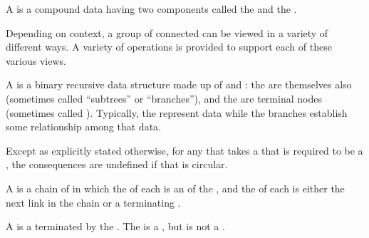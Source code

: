 
A  is a compound data  
having two components called the  and the .


Depending on context, a group of connected  can be viewed
in a variety of different ways.  A variety of operations is provided to
support each of these various views.


A  is a binary recursive data structure made up of
 and :
the  are themselves also 
(sometimes called ``subtrees'' or ``branches''), and the 
are terminal nodes (sometimes called ). 
Typically, the  represent data while the branches 
establish some relationship among that data.



Except as explicitly stated otherwise,
for any   that takes a 
that is required to be a ,
the consequences are undefined
if that  is circular.

\endsubsubsection%

\endsubsection%


A  is a chain of  in which the  of each
 is an  of the , 
and the  of each  is either the next
link in the chain or a terminating .  

A  is a  terminated by the .
The  is a , but is not a .

